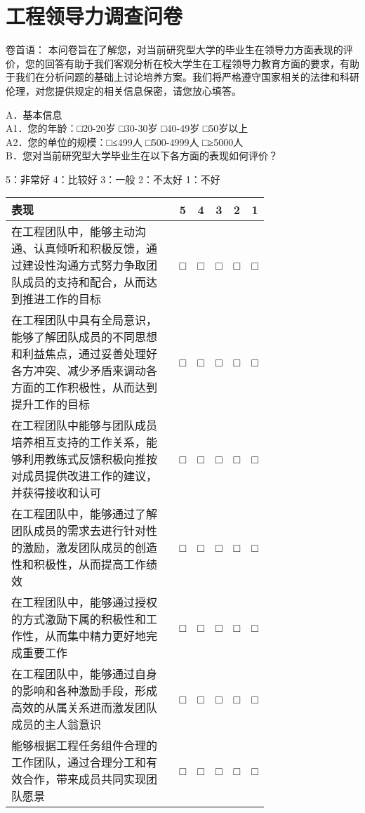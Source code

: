 \documentclass[degree=doctor]{sysuthesis}
\begin{document}
\START
\showoutput

\appendix

\setcounter{page}{115}
\chapter{工程领导力调查问卷}

卷首语：
本问卷旨在了解您，对当前研究型大学的毕业生在领导力方面表现的评价，您的回答有助于我们客观分析在校大学生在工程领导力教育方面的要求，有助于我们在分析问题的基础上讨论培养方案。我们将严格遵守国家相关的法律和科研伦理，对您提供规定的相关信息保密，请您放心填答。

\null\par

\noindent A．基本信息 \\
A1．您的年龄：□20-20岁 □30-30岁 □40-49岁 □50岁以上 \\
A2．您的单位的规模：□≤499人 □500-4999人 □≥5000人 \\
B．您对当前研究型大学毕业生在以下各方面的表现如何评价？

5：非常好 4：比较好 3：一般 2：不太好 1：不好 \\
\begin{tabular}{|p{0.73\linewidth}|ccccc|}
  \hline
  \centering 表现 & 5 & 4 & 3 & 2 & 1 \\
  \hline
  在工程团队中，能够主动沟通、认真倾听和积极反馈，通过建设性沟通方式努力争取团队成员的支持和配合，从而达到推进工作的目标 & □ & □ & □ & □ & □ \\
  \hline
  在工程团队中具有全局意识，能够了解团队成员的不同思想和利益焦点，通过妥善处理好各方冲突、减少矛盾来调动各方面的工作积极性，从而达到提升工作的目标 & □ & □ & □ & □ & □ \\
  \hline
  在工程团队中能够与团队成员培养相互支持的工作关系，能够利用教练式反馈积极向推按对成员提供改进工作的建议，并获得接收和认可 & □ & □ & □ & □ & □ \\
  \hline
  在工程团队中，能够通过了解团队成员的需求去进行针对性的激励，激发团队成员的创造性和积极性，从而提高工作绩效 & □ & □ & □ & □ & □ \\
  \hline
  在工程团队中，能够通过授权的方式激励下属的积极性和工作性，从而集中精力更好地完成重要工作 & □ & □ & □ & □ & □ \\
  \hline
  在工程团队中，能够通过自身的影响和各种激励手段，形成高效的从属关系进而激发团队成员的主人翁意识 & □ & □ & □ & □ & □ \\
  \hline
  能够根据工程任务组件合理的工作团队，通过合理分工和有效合作，带来成员共同实现团队愿景 & □ & □ & □ & □ & □ \\
  \hline
\end{tabular}


\clearpage
\OMIT
\end{document}
